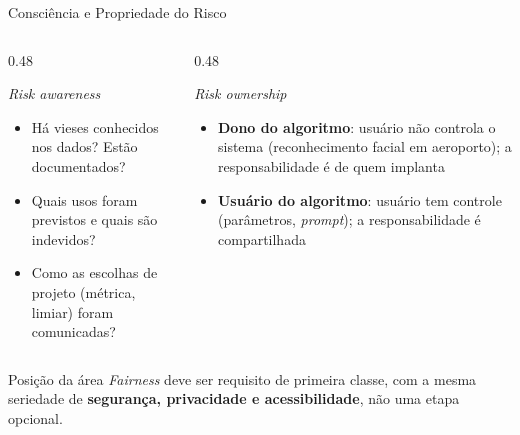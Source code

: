 \documentclass[aspectratio=169,xcolor=dvipsnames]{beamer}
\begin{document}
  \begin{frame}{Consciência e Propriedade do Risco}
    \begin{columns}[T]
      \begin{column}{0.48\textwidth}
        \begin{block}{\textit{Risk awareness}}
          \begin{itemize}\setlength{\itemsep}{0.2em}
            \item Há vieses conhecidos nos dados? Estão documentados?
            \item Quais usos foram previstos e quais são indevidos?
            \item Como as escolhas de projeto (métrica, limiar) foram comunicadas?
          \end{itemize}
        \end{block}
      \end{column}
      \begin{column}{0.48\textwidth}
        \begin{block}{\textit{Risk ownership}}
          \begin{itemize}\setlength{\itemsep}{0.2em}
            \item \textbf{Dono do algoritmo}: usuário não controla o sistema (reconhecimento facial em aeroporto); a responsabilidade é de quem implanta
            \item \textbf{Usuário do algoritmo}: usuário tem controle (parâmetros, \textit{prompt}); a responsabilidade é compartilhada
          \end{itemize}
        \end{block}
      \end{column}
    \end{columns}

    \vspace{0.2em}
    \begin{alertblock}{Posição da área}
      \textit{Fairness} deve ser requisito de primeira classe, com a mesma seriedade de \textbf{segurança, privacidade e acessibilidade}, não uma etapa opcional.
    \end{alertblock}
  \end{frame}

\end{document}
